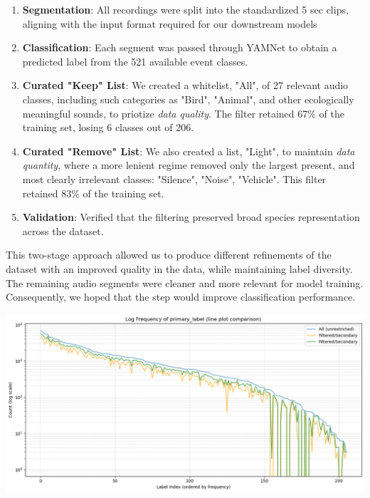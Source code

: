 \documentclass[11pt]{article}
\begin{document}
\begin{enumerate}
  \item \textbf{Segmentation}: All recordings were split into the standardized 5 sec clips, aligning with the input format required for our downstream models
  \item \textbf{Classification}: Each segment was passed through YAMNet to obtain a predicted label from the 521 available event classes.
  \item \textbf{Curated "Keep" List}: We created a whitelist, "All", of 27 relevant audio classes, including such categories as "Bird", "Animal", and other ecologically meaningful sounds, to priotize \textit{data quality}. The filter retained 67\% of the training set, losing 6 classes out of 206.
  \item \textbf{Curated "Remove" List}: We also created a list, "Light", to maintain \textit{data quantity}, where a more lenient regime removed only the largest present, and most clearly irrelevant classes: "Silence", "Noise", "Vehicle". This filter retained 83\% of the training set.
  \item \textbf{Validation}: Verified that the filtering preserved broad species representation across the dataset.
\end{enumerate}

\begin{minipage}{0.48\linewidth}
  This two-stage approach allowed us to produce different refinements of the dataset with an improved quality in the data, while maintaining label diversity. The remaining audio segments were cleaner and more relevant for model training. Consequently, we hoped that the step would improve classification performance.
\end{minipage}
\hfill
\begin{minipage}{0.48\linewidth}
  \includegraphics[width=\linewidth]{img/primary_yamnet_filtering.png}
\end{minipage}
\end{document}
